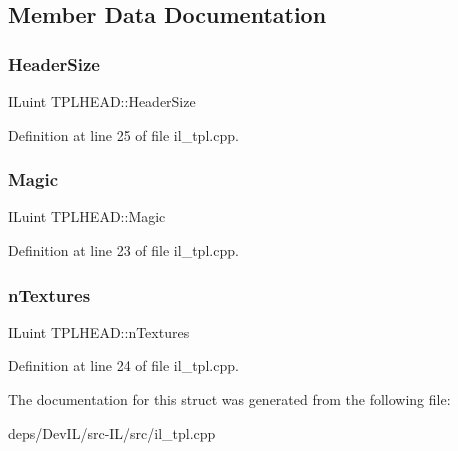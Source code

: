 \subsection{Member Data Documentation}
\mbox{\label{structTPLHEAD_a209061715686ec4371d924a672d7e232}} 
\subsubsection{\texorpdfstring{Header\+Size}{HeaderSize}}
{\footnotesize\ttfamily I\+Luint T\+P\+L\+H\+E\+A\+D\+::\+Header\+Size}



Definition at line 25 of file il\+\_\+tpl.\+cpp.

\mbox{\label{structTPLHEAD_a4dc3fb9afc2b6159957b5ea3d224f248}} 
\subsubsection{\texorpdfstring{Magic}{Magic}}
{\footnotesize\ttfamily I\+Luint T\+P\+L\+H\+E\+A\+D\+::\+Magic}



Definition at line 23 of file il\+\_\+tpl.\+cpp.

\mbox{\label{structTPLHEAD_acd23f7f00a37e2232a95858437700054}} 
\subsubsection{\texorpdfstring{n\+Textures}{nTextures}}
{\footnotesize\ttfamily I\+Luint T\+P\+L\+H\+E\+A\+D\+::n\+Textures}



Definition at line 24 of file il\+\_\+tpl.\+cpp.



The documentation for this struct was generated from the following file\+:\begin{DoxyCompactItemize}
\item 
deps/\+Dev\+I\+L/src-\/\+I\+L/src/il\+\_\+tpl.\+cpp\end{DoxyCompactItemize}
